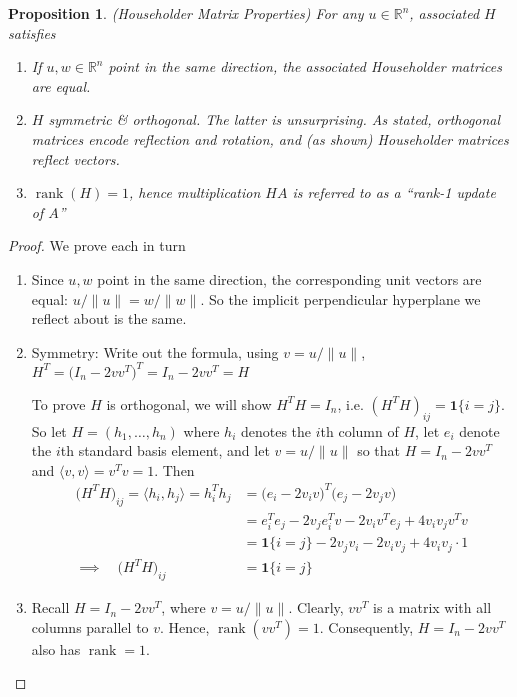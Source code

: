 \documentclass[12pt]{article}
\numberwithin{equation}{section} %
\theoremstyle{plain}
\newtheorem{prop}[thm]{Proposition}
\theoremstyle{definition}
\theoremstyle{remark}
\newcommand{\Rn}{\mathbb{R}^n}
\newcommand{\rank}{\operatorname{rank}}
\begin{document}
\begin{prop}\emph{(Householder Matrix Properties)}
For any $u\in\Rn$, associated $H$ satisfies
\begin{enumerate}[label=\emph{(\roman*)}]
    \item If $u,w\in\Rn$ point in the same direction, the associated
      Householder matrices are equal.
  \item $H$ symmetric \& orthogonal.
    The latter is unsurprising. As stated, orthogonal matrices
    encode reflection and rotation, and (as shown) Householder matrices
    reflect vectors.
  \item $\rank(H)=1$, hence multiplication $HA$ is referred to as a
    \emph{``rank-1 update of $A$''}
\end{enumerate}
\end{prop}
\begin{proof}
We prove each in turn
\begin{enumerate}[label=(\roman*)]
  \item
    Since $u,w$ point in the same direction, the corresponding unit
    vectors are equal: $u/\lVert u\rVert=w/\lVert w\rVert$.  So the
    implicit perpendicular hyperplane we reflect about is the same.
  \item
    Symmetry:
    Write out the formula, using $v=u/\lVert u\rVert$,
      $H^T
      = \big(I_n- 2vv^T\big)^T
      = I_n - 2vv^T = H$

    To prove $H$ is orthogonal, we will show $H^TH=I_n$, i.e.
    $(H^TH)_{ij}=\mathbf{1}\{i=j\}$.
    So let $H=(h_1,\ldots,h_n)$ where $h_i$ denotes the $i$th column of
    $H$, let $e_i$ denote the $i$th standard basis element, and let
    $v=u/\lVert u\rVert$ so that $H=I_n-2vv^T$ and
    $\langle v,v\rangle=v^Tv=1$. Then
    \begin{align*}
      \big(H^TH\big)_{ij}
      =
      \langle h_i, h_j\rangle
      = h_i^Th_j
      &=
      \big(e_i - 2v_iv\big)^T
      \big(e_j - 2v_jv\big)
      \\
      &=
      e_i^Te_j - 2v_je_i^T v
      - 2v_i v^Te_j + 4v_iv_j v^Tv
      \\
      &=
      \mathbf{1}\{i=j\}
      - 2v_jv_i
      - 2v_iv_j + 4v_iv_j\cdot 1
      \\
      \implies\quad
      \big(H^TH\big)_{ij}
      &=
      \mathbf{1}\{i=j\}
    \end{align*}

  \item
    Recall $H=I_n-2vv^T$, where $v=u/\lVert u\rVert$.
    Clearly, $vv^T$ is a matrix with all columns parallel to $v$. Hence,
    $\rank(vv^T)=1$. Consequently, $H=I_n-2vv^T$ also has $\rank=1$.
\end{enumerate}
\end{proof}
\end{document}
